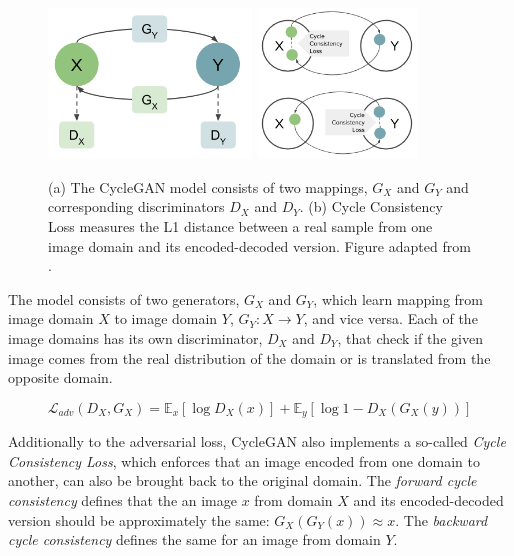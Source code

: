 \documentclass{article}
\begin{document}
\begin{figure}[t]
\centering
{}
{\includegraphics[height=4cm]{CycleGAN_graph}}\hspace{1cm}
{\includegraphics[height=4cm]{CycleGAN_graph2}}
\caption{\label{fig:cyclegan} (a) The CycleGAN model consists of two mappings, $G_{X}$ and $G_{Y}$ and corresponding discriminators $D_{X}$ and $D_{Y}$. (b) Cycle Consistency Loss measures the L1 distance between a real sample from one image domain and its encoded-decoded version. Figure adapted from \cite{zhu_unpaired_2017}.}
\end{figure}

The model consists of two generators, $G_{X}$ and $G_{Y}$, which learn mapping from image domain $X$ to image domain $Y$, $G_{Y}: X \rightarrow Y$, and vice versa. Each of the image domains has its own discriminator, $D_{X}$ and $D_{Y}$, that check if the given image comes from the real distribution of the domain or is translated from the opposite domain.

\begin{equation}
\mathcal{L}_{adv}(D_{X},G_{X}) = \mathbb{E}_{x}[\log D_{X}(x)] + \mathbb{E}_{y}[\log 1 - D_{X}(G_{X}(y))]
\label{eq:cyclegan_adv}
\end{equation}

Additionally to the adversarial loss, CycleGAN also implements a so-called \textit{Cycle Consistency Loss}, which enforces that an image encoded from one domain to another, can also be brought back to the original domain. The \textit{forward cycle consistency} defines that the  an image $x$ from domain $X$ and its encoded-decoded version should be approximately the same: $G_{X}(G_{Y}(x)) \approx x$. The \textit{backward cycle consistency} defines the same for an image from domain $Y$.
\end{document}
